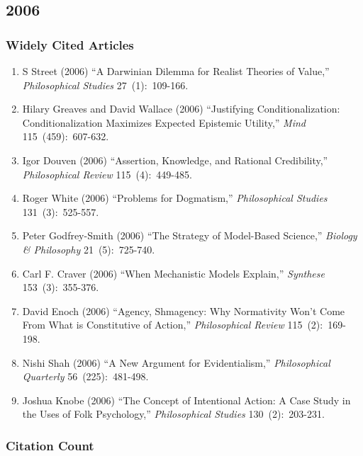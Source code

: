 \documentclass[
  10pt,
  letterpaper,
  DIV=11,
  numbers=noendperiod,
  twoside]{scrartcl}
\providecommand{\tightlist}{%
  \setlength{\itemsep}{0pt}\setlength{\parskip}{0pt}}\usepackage{longtable,booktabs,array}
\begin{document}
\newpage

\subsection{2006}\label{sec-s2006}

\subsubsection*{Widely Cited Articles}\label{widely-cited-articles-49}

\begin{enumerate}
\def\labelenumi{\arabic{enumi}.}
\tightlist
\item
  S Street (2006) ``A Darwinian Dilemma for Realist Theories of Value,''
  \emph{Philosophical Studies} 27~(1):~109-166.
\item
  Hilary Greaves and David Wallace (2006) ``Justifying
  Conditionalization: Conditionalization Maximizes Expected Epistemic
  Utility,'' \emph{Mind} 115~(459):~607-632.
\item
  Igor Douven (2006) ``Assertion, Knowledge, and Rational Credibility,''
  \emph{Philosophical Review} 115~(4):~449-485.
\item
  Roger White (2006) ``Problems for Dogmatism,'' \emph{Philosophical
  Studies} 131~(3):~525-557.
\item
  Peter Godfrey-Smith (2006) ``The Strategy of Model-Based Science,''
  \emph{Biology \& Philosophy} 21~(5):~725-740.
\item
  Carl F. Craver (2006) ``When Mechanistic Models Explain,''
  \emph{Synthese} 153~(3):~355-376.
\item
  David Enoch (2006) ``Agency, Shmagency: Why Normativity Won't Come
  From What is Constitutive of Action,'' \emph{Philosophical Review}
  115~(2):~169-198.
\item
  Nishi Shah (2006) ``A New Argument for Evidentialism,''
  \emph{Philosophical Quarterly} 56~(225):~481-498.
\item
  Joshua Knobe (2006) ``The Concept of Intentional Action: A Case Study
  in the Uses of Folk Psychology,'' \emph{Philosophical Studies}
  130~(2):~203-231.
\end{enumerate}

\subsubsection*{Citation Count}\label{sec-count-2006}
\end{document}
